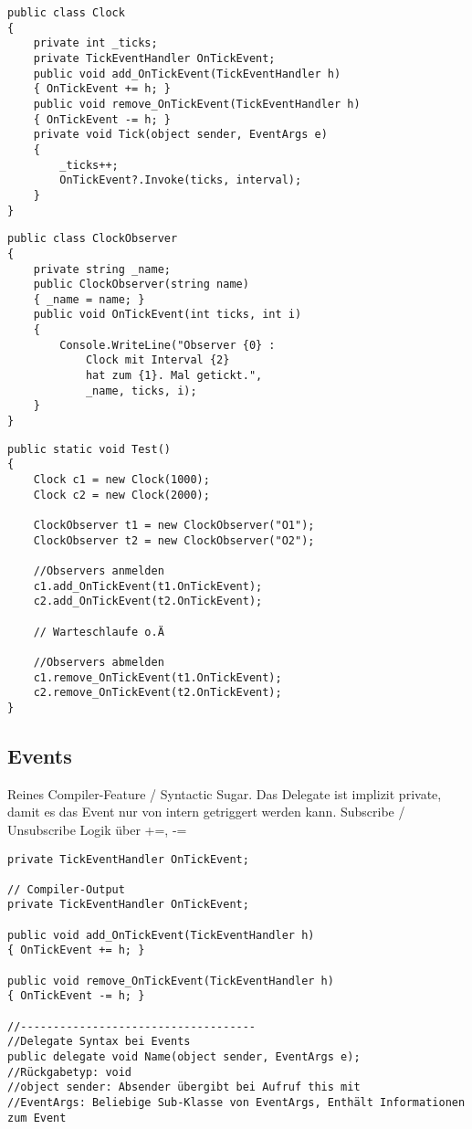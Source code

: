 \begin{multicols*}{2}
\begin{lstlisting}
public class Clock
{
    private int _ticks;
    private TickEventHandler OnTickEvent;
    public void add_OnTickEvent(TickEventHandler h)
    { OnTickEvent += h; }
    public void remove_OnTickEvent(TickEventHandler h)
    { OnTickEvent -= h; }
    private void Tick(object sender, EventArgs e)
    {
        _ticks++;
        OnTickEvent?.Invoke(ticks, interval);
    }
}
\end{lstlisting}
\begin{lstlisting}
public class ClockObserver
{
    private string _name;
    public ClockObserver(string name)
    { _name = name; }
    public void OnTickEvent(int ticks, int i) 
    {
        Console.WriteLine("Observer {0} :
            Clock mit Interval {2}
            hat zum {1}. Mal getickt.", 
            _name, ticks, i);
    }
}
\end{lstlisting}
\begin{lstlisting}
public static void Test()
{
    Clock c1 = new Clock(1000);
    Clock c2 = new Clock(2000);

    ClockObserver t1 = new ClockObserver("O1");
    ClockObserver t2 = new ClockObserver("O2");

    //Observers anmelden
    c1.add_OnTickEvent(t1.OnTickEvent);
    c2.add_OnTickEvent(t2.OnTickEvent);

    // Warteschlaufe o.Ä

    //Observers abmelden
    c1.remove_OnTickEvent(t1.OnTickEvent);
    c2.remove_OnTickEvent(t2.OnTickEvent); 
}
\end{lstlisting}
\subsection{Events}
Reines Compiler-Feature / Syntactic Sugar. 
Das Delegate ist implizit private, damit es das Event nur von intern getriggert werden kann.
Subscribe / Unsubscribe Logik über +=, -=
\begin{lstlisting}
private TickEventHandler OnTickEvent;

// Compiler-Output
private TickEventHandler OnTickEvent;

public void add_OnTickEvent(TickEventHandler h)
{ OnTickEvent += h; }

public void remove_OnTickEvent(TickEventHandler h)
{ OnTickEvent -= h; }

//------------------------------------
//Delegate Syntax bei Events
public delegate void Name(object sender, EventArgs e);
//Rückgabetyp: void
//object sender: Absender übergibt bei Aufruf this mit
//EventArgs: Beliebige Sub-Klasse von EventArgs, Enthält Informationen zum Event
\end{lstlisting}

\end{multicols*}
